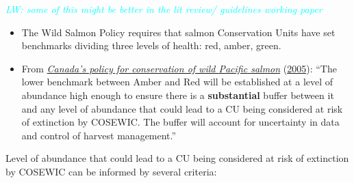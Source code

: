 \documentclass[11pt]{book}
\begin{document}
\emph{\textcolor{cyan}{LW: some of this might be better in the lit review/ guidelines working paper}}
\begin{itemize}

\item
  The Wild Salmon Policy requires that salmon Conservation Units have set benchmarks dividing three levels of health: red, amber, green.
\item
  From \protect\hyperlink{ref-canada_canadas_2005}{\emph{Canada's policy for conservation of wild {Pacific} salmon}} (\protect\hyperlink{ref-canada_canadas_2005}{2005}): ``The lower benchmark between Amber and Red will be established at a level of abundance high enough to ensure there is a \textbf{substantial} buffer between it and any level of abundance that could lead to a CU being considered at risk of extinction by COSEWIC. The buffer will account for uncertainty in data and control of harvest management.''
\end{itemize}
Level of abundance that could lead to a CU being considered at risk of extinction by COSEWIC can be informed by several criteria:
\end{document}
